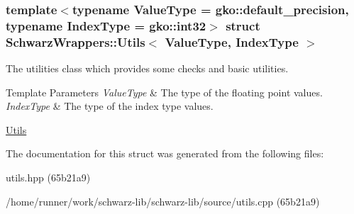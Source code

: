 \subsubsection*{template$<$typename Value\+Type = gko\+::default\+\_\+precision, typename Index\+Type = gko\+::int32$>$\newline
struct Schwarz\+Wrappers\+::\+Utils$<$ Value\+Type, Index\+Type $>$}

The utilities class which provides some checks and basic utilities. 


\begin{DoxyTemplParams}{Template Parameters}
{\em Value\+Type} & The type of the floating point values. \\
\hline
{\em Index\+Type} & The type of the index type values.\\
\hline
\end{DoxyTemplParams}
\hyperlink{group__utils}{Utils} 

The documentation for this struct was generated from the following files\+:\begin{DoxyCompactItemize}
\item 
utils.\+hpp (65b21a9)\item 
/home/runner/work/schwarz-\/lib/schwarz-\/lib/source/utils.\+cpp (65b21a9)\end{DoxyCompactItemize}
